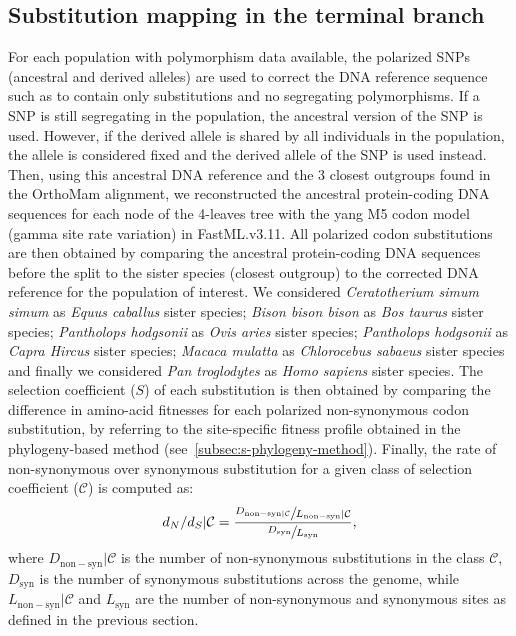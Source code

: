 \documentclass{article}
\newcommand{\dn}{d_N}
\newcommand{\ds}{d_S}
\newcommand{\dnds}{\dn / \ds}
\newcommand{\Sphy}{S}
\newcommand{\Sphyclass}{\mathcal{C}}
\begin{document}
    \subsection*{Substitution mapping in the terminal branch}
    \label{subsec:substitution-mapping-in-the-terminal-branch}
    For each population with polymorphism data available, the polarized SNPs (ancestral and derived alleles) are used to correct the DNA reference sequence such as to contain only substitutions and no segregating polymorphisms.
    If a SNP is still segregating in the population, the ancestral version of the SNP is used.
    However, if the derived allele is shared by all individuals in the population, the allele is considered fixed and the derived allele of the SNP is used instead.
    Then, using this ancestral DNA reference and the $3$ closest outgroups found in the OrthoMam alignment, we reconstructed the ancestral protein-coding DNA sequences for each node of the 4-leaves tree with the yang M5 codon model (gamma site rate variation) in FastML.v3.11\cite{ashkenazy_fastml_2012}.
    All polarized codon substitutions are then obtained by comparing the ancestral protein-coding DNA sequences before the split to the sister species (closest outgroup) to the corrected DNA reference for the population of interest.
    We considered \textit{Ceratotherium simum simum} as \textit{Equus caballus} sister species; \textit{Bison bison bison} as \textit{Bos taurus} sister species; \textit{Pantholops hodgsonii} as \textit{Ovis aries} sister species; \textit{Pantholops hodgsonii} as \textit{Capra Hircus} sister species; \textit{Macaca mulatta} as \textit{Chlorocebus sabaeus} sister species and finally we considered \textit{Pan troglodytes} as \textit{Homo sapiens} sister species.
    The selection coefficient ($\Sphy$) of each substitution is then obtained by comparing the difference in amino-acid fitnesses for each polarized non-synonymous codon substitution, by referring to the site-specific fitness profile obtained in the phylogeny-based method (see~\ref{subsec:s-phylogeny-method}).
    Finally, the rate of non-synonymous over synonymous substitution for a given class of selection coefficient ($\Sphyclass$) is computed as:
    \begin{equation*}
        \dnds | \Sphyclass = \frac{\sfrac{D_{\mathrm{non-syn} | \Sphyclass}}{L_{\mathrm{non-syn}} | \Sphyclass}}{\sfrac{D_{\mathrm{syn}}}{L_{\mathrm{syn}}}},
    \end{equation*}
    where $D_{\mathrm{non-syn}} | \Sphyclass $ is the number of non-synonymous substitutions in the class $\Sphyclass$, $D_{\mathrm{syn}}$ is the number of synonymous substitutions across the genome, while $L_{\mathrm{non-syn}} | \Sphyclass$ and $L_{\mathrm{syn}}$ are the number of non-synonymous and synonymous sites as defined in the previous section.

    \printbibliography
\end{document}
